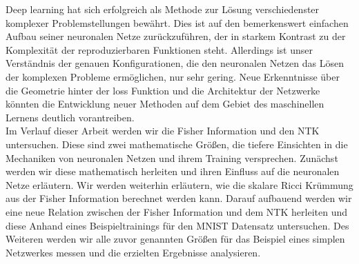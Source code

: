 Deep learning hat sich erfolgreich als Methode zur Lösung verschiedenster komplexer Problemstellungen bewährt. Dies ist auf den bemerkenswert einfachen Aufbau seiner neuronalen Netze zurückzuführen, der in starkem Kontrast zu der Komplexität der reproduzierbaren Funktionen steht. Allerdings ist unser Verständnis der genauen Konfigurationen, die den neuronalen Netzen das Lösen der komplexen Probleme ermöglichen, nur sehr gering. Neue Erkenntnisse über die Geometrie hinter der loss Funktion und die Architektur der Netzwerke könnten die Entwicklung neuer Methoden auf dem Gebiet des maschinellen Lernens deutlich vorantreiben.\\
Im Verlauf dieser Arbeit werden wir die Fisher Information und den NTK untersuchen. Diese sind zwei mathematische Grö\ss en, die tiefere Einsichten in die Mechaniken von neuronalen Netzen und ihrem Training versprechen. Zunächst werden wir diese mathematisch herleiten und ihren Einfluss auf die neuronalen Netze erläutern. Wir werden weiterhin erläutern, wie die skalare Ricci Krümmung aus der Fisher Information berechnet werden kann. Darauf aufbauend werden wir eine neue Relation zwischen der Fisher Information und dem NTK herleiten und diese Anhand eines Beispieltrainings für den MNIST Datensatz untersuchen. Des Weiteren werden wir alle zuvor genannten Grö\ss en für das Beispiel eines simplen Netzwerkes messen und die erzielten Ergebnisse analysieren.